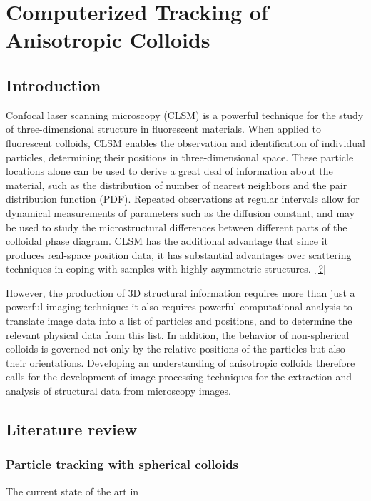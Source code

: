 \chapter{Computerized Tracking of Anisotropic Colloids}
\section{Introduction}

Confocal laser scanning microscopy (CLSM) is a powerful technique for the study of three-dimensional
structure in fluorescent materials. When applied to fluorescent colloids, CLSM enables the observation
and identification of individual particles, determining their positions in three-dimensional space.
These particle locations alone can be used to derive a great deal
of information about the material, such as the distribution of number of nearest neighbors and
the pair distribution function (PDF). Repeated observations at regular intervals allow for dynamical
measurements of parameters such as the diffusion constant, and may be used to study the microstructural
differences between different parts of the colloidal phase diagram. CLSM has the additional advantage
that since it produces real-space position data, it has substantial advantages over scattering techniques
in coping with samples with highly asymmetric structures.~\ref{?}

However, 
the production of 3D structural information requires more than just a powerful imaging technique: it also
requires powerful computational analysis to translate image data into a list of particles and positions, and
to determine the relevant physical data from this list.  In addition, the behavior of non-spherical colloids
is governed not only by the relative positions of the particles but also their orientations. Developing an
understanding of anisotropic colloids
therefore calls for the development of image processing techniques for the extraction and analysis of
structural data from microscopy images.

\section{Literature review}

\subsection{Particle tracking with spherical colloids}

The current state of the art in 


